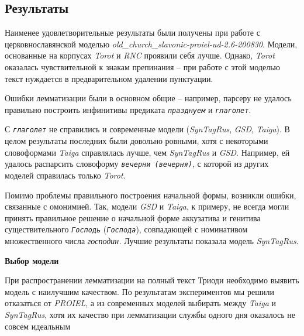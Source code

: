 \documentclass[
  letterpaper,
]{book}
\begin{document}
\hypertarget{sec-lemm_csl_result}{%
\subsection{Результаты}\label{sec-lemm_csl_result}}

Наименее удовлетворительные результаты были получены при работе с
церковнославянской моделью
\emph{old\_church\_slavonic-proiel-ud-2.6-200830}. Модели, основанные на
корпусах \emph{Torot} и \emph{RNC} проявили себя лучше. Однако,
\emph{Torot} оказалась чувствительной к знакам препинания -- при работе
с этой моделью текст нуждается в предварительном удалении пунктуации.

Ошибки лемматизации были в основном общие -- например, парсеру не
удалось правильно построить инфинитивы предиката
\emph{\texttt{празднуем}} и \emph{\texttt{глаголет}}.

С \emph{\texttt{глаголет}} не справились и современные модели
(\emph{SynTagRus}, \emph{GSD}, \emph{Taiga}). В целом результаты
последних были довольно ровными, хотя с некоторыми словоформами
\emph{Taiga} справлялась лучше, чем \emph{SynTagRus} и \emph{GSD}.
Например, ей удалось распарсить словоформу
\emph{\texttt{вечерни\ (вечерня)}}, с которой из других моделей
справилась только \emph{Torot}.

Помимо проблемы правильного построения начальной формы, возникли ошибки,
связанные с омонимией. Так, модели \emph{GSD} и \emph{Taiga}, к примеру,
не всегда могли принять правильное решение о начальной форме аккузатива
и генитива существительного \emph{\texttt{Господь}}
(\emph{\texttt{Господа}}), совпадающей с номинативом множественного
числа \emph{господин.} Лучшие результаты показала модель
\emph{SynTagRus}.

\begin{tcolorbox}[enhanced jigsaw, rightrule=.15mm, breakable, colframe=quarto-callout-note-color-frame, colback=white, leftrule=.75mm, left=2mm, arc=.35mm, opacityback=0, toprule=.15mm, bottomrule=.15mm]

\textbf{Выбор модели}\vspace{2mm}

При распространении лемматизации на полный текст Триоди необходимо
выявить модель с наилучшим качеством. По результатам экспериментов мы
решили отказаться от \emph{PROIEL}, а из современных моделей выбирать
между \emph{Taiga} и \emph{SynTagRus}, хотя их качество при лемматизации
службы одного дня оказалось не совсем идеальным

\end{tcolorbox}
\end{document}
